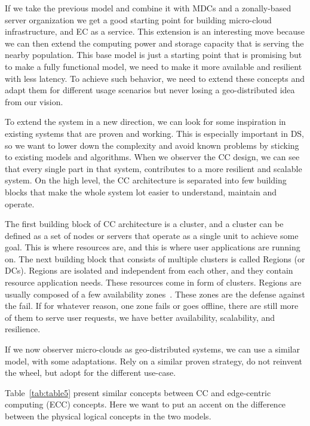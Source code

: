If we take the previous model and combine it with MDCs and a zonally-based server organization we get a good starting point for building micro-cloud infrastructure, and EC as a service. This extension is an interesting move because we can then extend the computing power and storage capacity that is serving the nearby population. This base model is just a starting point that is promising but to make a fully functional model, we need to make it more available and resilient with less latency. To achieve such behavior, we need to extend these concepts and adapt them for different usage scenarios but never losing a geo-distributed idea from our vision.

To extend the system in a new direction, we can look for some inspiration in existing systems that are proven and working. This is especially important in DS, so we want to lower down the complexity and avoid known problems by sticking to existing models and algorithms. When we observer the CC design, we can see that every single part in that system, contributes to a more resilient and scalable system. On the high level, the CC architecture is separated into few building blocks that make the whole system lot easier to understand, maintain and operate.

The first building block of CC architecture is a cluster, and a cluster can be defined as a set of nodes or servers that operate as a single unit to achieve some goal. This is where resources are, and this is where user applications are running on. The next building block that consists of multiple clusters is called Regions (or DCs). Regions are isolated and independent from each other, and they contain resource application needs. These resources come in form of clusters. Regions are usually composed of a few availability zones~\cite{SouzaMFAK19}. These zones are the defense against the fail. If for whatever reason, one zone fails or goes offline, there are still more of them to serve user requests, we have better availability, scalability, and resilience.

If we now observer micro-clouds as geo-distributed systems, we can use a similar model, with some adaptations. Rely on a similar proven strategy, do not reinvent the wheel, but adopt for the different use-case.

Table~\ref{tab:table5} present similar concepts between CC and edge-centric computing (ECC) concepts. Here we want to put an accent on the difference between the physical logical concepts in the two models.

